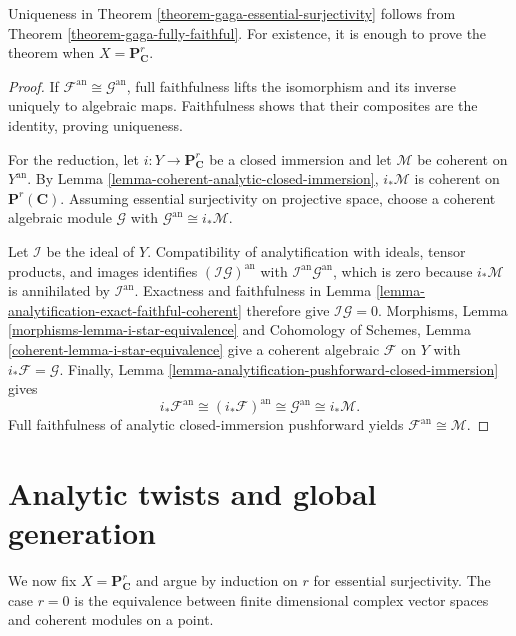 \begin{lemma}
\label{lemma-gaga-essential-surjectivity-projective-reduction}
Uniqueness in Theorem \ref{theorem-gaga-essential-surjectivity} follows from
Theorem \ref{theorem-gaga-fully-faithful}. For existence, it is enough to
prove the theorem when $X=\mathbf P^r_{\mathbf C}$.
\end{lemma}

\begin{proof}
If $\mathcal F^{\mathrm{an}}\cong\mathcal G^{\mathrm{an}}$, full faithfulness
lifts the isomorphism and its inverse uniquely to algebraic maps. Faithfulness
shows that their composites are the identity, proving uniqueness.

For the reduction, let $i:Y\to\mathbf P^r_{\mathbf C}$ be a closed immersion
and let $\mathcal M$ be coherent on $Y^{\mathrm{an}}$. By Lemma
\ref{lemma-coherent-analytic-closed-immersion}, $i_*\mathcal M$ is coherent
on $\mathbf P^r(\mathbf C)$. Assuming essential surjectivity on projective
space, choose a coherent algebraic module $\mathcal G$ with
$\mathcal G^{\mathrm{an}}\cong i_*\mathcal M$.

Let $\mathcal I$ be the ideal of $Y$. Compatibility of analytification with
ideals, tensor products, and images identifies
$(\mathcal I\mathcal G)^{\mathrm{an}}$ with
$\mathcal I^{\mathrm{an}}\mathcal G^{\mathrm{an}}$, which is zero because
$i_*\mathcal M$ is annihilated by $\mathcal I^{\mathrm{an}}$. Exactness and
faithfulness in Lemma
\ref{lemma-analytification-exact-faithful-coherent} therefore give
$\mathcal I\mathcal G=0$. Morphisms, Lemma
\ref{morphisms-lemma-i-star-equivalence} and Cohomology of Schemes, Lemma
\ref{coherent-lemma-i-star-equivalence} give a coherent algebraic
$\mathcal F$ on $Y$ with $i_*\mathcal F=\mathcal G$. Finally,
Lemma \ref{lemma-analytification-pushforward-closed-immersion} gives
$$
i_*\mathcal F^{\mathrm{an}}
\cong(i_*\mathcal F)^{\mathrm{an}}
\cong\mathcal G^{\mathrm{an}}
\cong i_*\mathcal M.
$$
Full faithfulness of analytic closed-immersion pushforward yields
$\mathcal F^{\mathrm{an}}\cong\mathcal M$.
\end{proof}

\section{Analytic twists and global generation}
\label{section-gaga-analytic-twists}

We now fix $X=\mathbf P^r_{\mathbf C}$ and argue by induction on $r$ for
essential surjectivity. The case $r=0$ is the equivalence between finite
dimensional complex vector spaces and coherent modules on a point.

